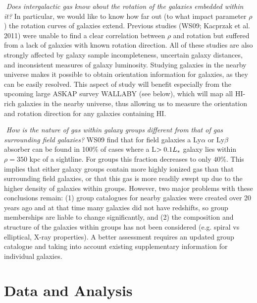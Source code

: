 \documentclass[iop]{emulateapj-rtx4}
\begin{document}
\vspace{10pt}
\indent \textbullet $ $ \textit{Does intergalactic gas know about the rotation of the galaxies embedded within it?} In particular, we would like to know how far out (to what impact parameter $\rho$) the rotation curves of galaxies extend. Previous studies (WS09; Kacprzak et al. 2011) were unable to find a clear correlation between $\rho$ and rotation but suffered from a lack of galaxies with known rotation direction. All of these studies are also strongly affected by galaxy sample incompleteness, uncertain galaxy distances, and inconsistent measures of galaxy luminosity. Studying galaxies in the nearby universe makes it possible to obtain orientation information for galaxies, as they can be easily resolved. This aspect of study will benefit especially from the upcoming large ASKAP survey WALLABY (see below), which will map all HI-rich galaxies in the nearby universe, thus allowing us to measure the orientation and rotation direction for any galaxies containing HI.

\vspace{10pt}
\indent \textbullet $ $ \textit{How is the nature of gas within galaxy groups different from that of gas surrounding field galaxies?} WS09 find that for field galaxies a Ly$\alpha$ or Ly$\beta$ absorber can be found in 100$\%$ of cases where a L$>0.1L_{\**}$ galaxy lies within $\rho=350$ kpc of a sightline. For groups this fraction decreases to only $40\%$. This implies that either galaxy groups contain more highly ionized gas than that surrounding field galaxies, or that this gas is more readily swept up due to the higher density of galaxies within groups. However, two major problems with these conclusions remain: (1) group catalogues for nearby galaxies were created over 20 years ago and at that time many galaxies did not have redshifts, so group memberships are liable to change significantly, and (2) the composition and structure of the galaxies within groups has not been considered (e.g. spiral vs elliptical, X-ray properties). A better assessment requires an updated group catalogue and taking into account existing supplementary information for individual galaxies.

\vspace{15pt}


\section{Data and Analysis}
\end{document}
